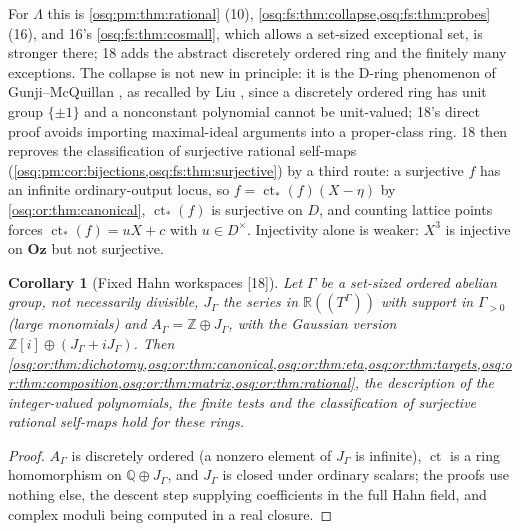 \documentclass[11pt,letterpaper]{article}
\numberwithin{equation}{section}
\newtheorem{corollary}[corollary]{Corollary}
\theoremstyle{definition}
\theoremstyle{remark}
\theoremstyle{plain}
\newcommand{\Oz}{\mathbf{Oz}}
\newcommand{\Z}{\mathbb Z}
\newcommand{\Q}{\mathbb Q}
\newcommand{\R}{\mathbb R}
\newcommand{\ct}{\operatorname{ct}}
\newcommand{\src}[1]{\textup{\textsf{[#1]}}}
\begin{document}
For $\Lambda$ this is \cref{osq:pm:thm:rational} (10), \cref{osq:fs:thm:collapse,osq:fs:thm:probes} (16), and 16's \cref{osq:fs:thm:cosmall}, which allows a
set-sized exceptional set, is stronger there; 18 adds the abstract discretely ordered ring and the finitely many exceptions. The collapse is not new in
principle: it is the D-ring phenomenon of Gunji--McQuillan \cite{GunjiMcQuillan}, as recalled by Liu \cite[Proposition~1.12]{Liu}, since a discretely
ordered ring has unit group $\{\pm1\}$ and a nonconstant polynomial cannot be unit-valued; 18's direct proof avoids importing maximal-ideal arguments
into a proper-class ring. 18 then reproves the classification of surjective rational self-maps (\cref{osq:pm:cor:bijections,osq:fs:thm:surjective}) by a
third route: a surjective $f$ has an infinite ordinary-output locus, so $f=\ct_*(f)(X-\eta)$ by \cref{osq:or:thm:canonical}, $\ct_*(f)$ is surjective on
$D$, and counting lattice points forces $\ct_*(f)=uX+c$ with $u\in D^\times$. Injectivity alone is weaker: $X^3$ is injective on $\Oz$ but not
surjective.

\begin{corollary}[Fixed Hahn workspaces \src{18}]\label{osq:or:cor:workspace}
Let $\Gamma$ be a set-sized ordered abelian group, not necessarily divisible, $J_\Gamma$ the series in $\R(\!(T^\Gamma)\!)$ with support in $\Gamma_{>0}$
(large monomials) and $A_\Gamma=\Z\oplus J_\Gamma$, with the Gaussian version $\Z[i]\oplus(J_\Gamma+iJ_\Gamma)$. Then \cref{osq:or:thm:dichotomy,osq:or:thm:canonical,osq:or:thm:eta,osq:or:thm:targets,osq:or:thm:composition,osq:or:thm:matrix,osq:or:thm:rational},
the description of the integer-valued polynomials, the finite tests and the classification of surjective rational self-maps hold for these rings.
\end{corollary}
\begin{proof}
$A_\Gamma$ is discretely ordered (a nonzero element of $J_\Gamma$ is infinite), $\ct$ is a ring homomorphism on $\Q\oplus J_\Gamma$, and $J_\Gamma$ is closed
under ordinary scalars; the proofs use nothing else, the descent step supplying coefficients in the full Hahn field, and complex moduli being computed
in a real closure.
\end{proof}
\end{document}
